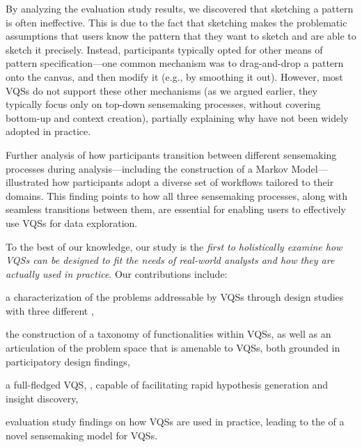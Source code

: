 \par By analyzing the evaluation study results, we discovered that sketching a pattern  is often ineffective. This is due to the fact that sketching makes the problematic assumptions that users know the pattern that they want to sketch and are able to sketch it precisely. Instead, participants typically opted for other means of pattern specification---one common mechanism was to drag-and-drop a  pattern onto the canvas, and then modify it (e.g., by smoothing it out). However, most VQSs do not support these other mechanisms (as we argued earlier, they typically focus only on top-down sensemaking processes, without covering bottom-up and context creation), partially explaining why  have not been widely adopted in practice.
\par Further analysis of how participants
transition between different sensemaking processes
during analysis---including the construction of a Markov Model---illustrated
how participants adopt a diverse set of workflows tailored
to their domains.  This finding points to how all three sensemaking processes, along with seamless transitions between them, are essential for enabling users to effectively use VQSs for data exploration.%
\par To the best of our knowledge, our study is the \emph{first to holistically examine how VQSs can be designed to fit the needs of real-world 
analysts and how they are actually used in practice}. Our contributions include: 
\begin{denselist}
\item a characterization of the problems addressable by VQSs through design studies with three different ,
\item the construction of a taxonomy of functionalities within VQSs, as well as an articulation of the problem space that is amenable to VQSs, both grounded in participatory design findings,
\item a full-fledged VQS, \zvpp, capable of facilitating rapid hypothesis generation and insight discovery,
\item evaluation study findings on how VQSs are used in practice, leading to the  of a novel sensemaking model for VQSs. %
\end{denselist}

